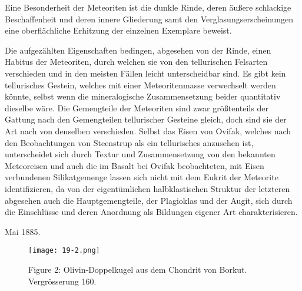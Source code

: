 \documentclass[a4paper, 12pt, oneside]{article}
\begin{document}
Eine Besonderheit der Meteoriten ist die dunkle Rinde, deren äußere schlackige Beschaffenheit und deren innere Gliederung samt den Verglasungserscheinungen eine oberflächliche Erhitzung der einzelnen Exemplare beweist.

Die aufgezählten Eigenschaften bedingen, abgesehen von der Rinde, einen Habitus der Meteoriten, durch welchen sie von den tellurischen Felsarten verschieden und in den meisten Fällen leicht unterscheidbar sind. Es gibt kein tellurisches Gestein, welches mit einer Meteoritenmasse verwechselt werden könnte, selbst wenn die mineralogische Zusammensetzung beider quantitativ dieselbe wäre. Die Gemengteile der Meteoriten sind zwar größtenteils der Gattung nach den Gemengteilen tellurischer Gesteine gleich, doch sind sie der Art nach von denselben verschieden. Selbst das Eisen von Ovifak, welches nach den Beobachtungen von Steenstrup als ein tellurisches anzusehen ist, unterscheidet sich durch Textur und Zusammensetzung von den bekannten Meteoreisen und auch die im Basalt bei Ovifak beobachteten, mit Eisen verbundenen Silikatgemenge lassen sich nicht mit dem Eukrit der Meteorite identifizieren, da von der eigentümlichen halbklastischen Struktur der letzteren abgesehen auch die Hauptgemengteile, der Plagioklas und der Augit, sich durch die Einschlüsse und deren Anordnung als Bildungen eigener Art charakterisieren.

Mai 1885.
\clearpage
\pagestyle{fancy}
\fancyhf{}
\cfoot{\thepage}
\clearpage
{}
\vspace*{\fill}
\begin{figure}[H]
\centering
\texttt{[image: 19-2.png]}
\caption{\small Figure 2: Olivin-Doppelkugel aus dem Chondrit von Borkut. Vergrösserung 160.}
\end{figure}
\vspace*{\fill}
\clearpage
\end{document}

